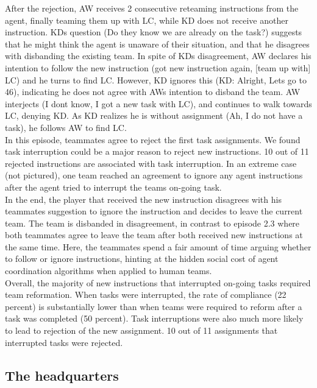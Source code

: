 After the rejection, AW receives 2 consecutive reteaming instructions from the agent, finally teaming them up with LC, while KD does not receive another instruction. KDs question (Do they know we are already on the task?) suggests that he might think the agent is unaware of their situation, and that he disagrees with disbanding the existing team. In spite of KDs disagreement, AW declares his intention to follow the new instruction (got new instruction again, [team up with] LC) and he turns to find LC. However, KD ignores this (KD: Alright, Lets go to 46), indicating he does not agree with AWs intention to disband the team. AW interjects (I dont know, I got a new task with LC), and continues to walk towards LC, denying KD. As KD realizes he is without assignment (Ah, I do not have a task), he follows AW to find LC. \\

In this episode, teammates agree to reject the first task assignments. We found task interruption could be a major reason to reject new instructions. 10 out of 11 rejected instructions are associated with task interruption. In an extreme case (not pictured), one team reached an agreement to ignore any agent instructions after the agent tried to interrupt the teams on-going task. \\

In the end, the player that received the new instruction disagrees with his teammates suggestion to ignore the instruction and decides to leave the current team. The team is disbanded in disagreement, in contrast to episode 2.3 where both teammates agree to leave the team after both received new instructions at the same time. Here, the teammates spend a fair amount of time arguing whether to follow or ignore instructions, hinting at the hidden social cost of agent coordination algorithms when applied to human teams. \\

Overall, the majority of new instructions that interrupted on-going tasks required team reformation. When tasks were interrupted, the rate of compliance (22 percent) is substantially lower than when teams were required to reform after a task was completed (50 percent). Task interruptions were also much more likely to lead to rejection of the new assignment. 10 out of 11 assignments that interrupted tasks were rejected.\\

\subsection{The headquarters}

